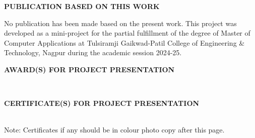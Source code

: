 \begin{center}
\textbf{\Large PUBLICATION BASED ON THIS WORK}
\end{center}
\vspace{1cm}
No publication has been made based on the present work. This project was developed as a mini-project for the partial fulfillment of the degree of Master of Computer Applications at Tulsiramji Gaikwad-Patil College of Engineering \& Technology, Nagpur during the academic session 2024-25.\\

\vspace{2cm}
\begin{center}
\textbf{\Large AWARD(S) FOR PROJECT PRESENTATION }
\end{center}\\
\vspace{3cm}
\begin{center}
\textbf{\Large CERTIFICATE(S) FOR PROJECT PRESENTATION  }
\end{center}\\
Note: Certificates if any should be in colour photo copy after this page.
\vspace{4cm}




